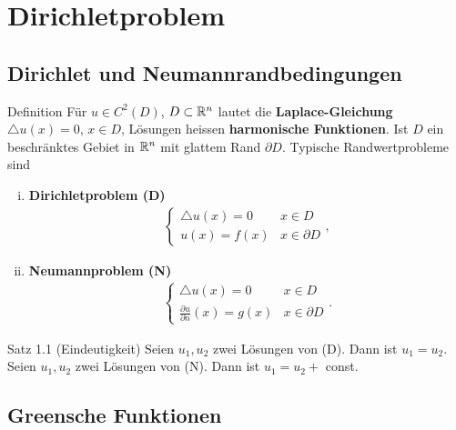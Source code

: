 \chapter{Dirichletproblem}

\section{Dirichlet und Neumannrandbedingungen}

\begin{namedtheorem}{Definition}
  Für $u\in C^2(D)$, $D\subset\mathbb{R}^n$ lautet die \textbf{Laplace-Gleichung} $\triangle u(x) = 0$, $x\in D$, Lösungen heissen \textbf{harmonische Funktionen}. Ist $D$ ein beschränktes Gebiet in $\mathbb{R}^n$ mit glattem Rand $\partial D$. Typische Randwertprobleme sind
  {\setlength\multicolsep{4pt}%
  \begin{multicols}{2}
    \begin{enumerate}[(i)]
      \item \textbf{Dirichletproblem (D)}
        \begin{align*}
          \begin{cases}
            \triangle u(x) = 0 & x\in D \\
            u(x) = f(x) & x\in\partial D
          \end{cases},
        \end{align*}
      \item \textbf{Neumannproblem (N)}
        \begin{align*}
          \begin{cases}
            \triangle u(x) = 0 & x\in D \\
            \frac{\partial u}{\partial n}(x) = g(x) & x\in\partial D
          \end{cases}.
        \end{align*}
    \end{enumerate}
  \end{multicols}}
\end{namedtheorem}

\begin{namedtheorem}{Satz 1.1 (Eindeutigkeit)}
  Seien $u_1,u_2$ zwei Lösungen von (D). Dann ist $u_1 = u_2$. Seien $u_1,u_2$ zwei Lösungen von (N). Dann ist $u_1 = u_2 + $ const.
\end{namedtheorem}

\section{Greensche Funktionen}

